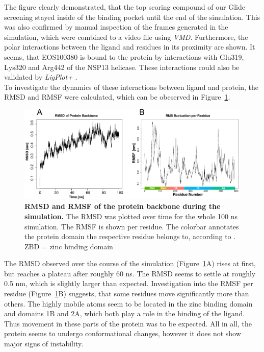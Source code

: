 \documentclass[11pt, letterpaper, titlepage]{article}
\renewcommand{\cite}{\parencite}
\begin{document}
The figure clearly demonstrated, that the top scoring compound of our Glide screening stayed inside of the binding pocket until the end of the simulation. This was also confirmed by manual inspection of the frames generated in the simulation, which were combined to a video file using \textit{VMD}. Furthermore, the polar interactions between the ligand and residues in its proximity are shown. It seems, that EOS100380 is bound to the protein by interactions with Glu319, Lys320 and Arg442 of the NSP13 helicase. These interactions could also be validated by \textit{LigPlot+} \cite{LigPlot}. \\

To investigate the dynamics of these interactions between ligand and protein, the \ac{RMSD} and \ac{RMSF} were calculated, which can be obeserved in Figure~\ref{rms}. 
\begin{figure}[h]
  \begin{center}
    \includegraphics[width=1.0\textwidth]{RMS_Protein.pdf}
  \end{center}
  \caption{\textbf{RMSD and RMSF of the protein backbone during the simulation.} The RMSD was plotted over time for the whole 100 ns simulation. The RMSF is shown per residue. The colorbar annotates the protein domain the respective residue belongs to, according to \textcite{Domains}. ZBD = zinc binding domain}
  \label{rms}
\end{figure}
The \ac{RMSD} observed over the course of the simulation (Figure~\ref{rms}A) rises at first, but reaches a plateau after roughly 60 ns. The RMSD seems to settle at roughly 0.5 nm, which is slightly larger than expected. Investigation into the RMSF per residue (Figure~\ref{rms}B) suggests, that some residues move significantly more than others. The highly mobile atoms seem to be located in the zinc binding domain and domains 1B and 2A, which both play a role in the binding of the ligand. Thus movement in these parts of the protein was to be expected. All in all, the protein seems to undergo conformational changes, however it does not show major signs of instability. 
\end{document}
